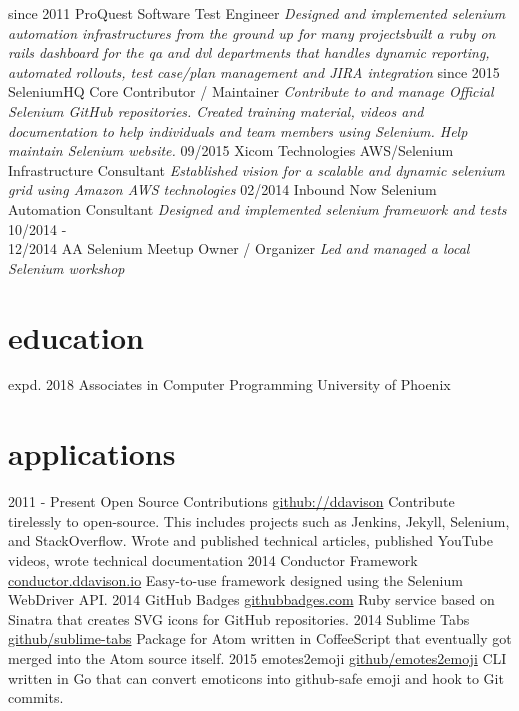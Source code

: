 \documentclass[]{ddavison-resume}
\begin{document}
\begin{entrylist}
  \entry
  	{since 2011}
  	{ProQuest}
  	{Software Test Engineer}
  	{\emph{Designed and implemented selenium automation infrastructures from the ground up for many projects\bullet built a ruby on rails dashboard for the qa and dvl departments that handles dynamic reporting, automated rollouts, test case/plan management and JIRA integration}} 
  \entry
  	{since 2015}
  	{SeleniumHQ}
  	{Core Contributor / Maintainer}
  	{\emph{Contribute to and manage Official Selenium GitHub repositories. Created training material, videos and documentation to help individuals and team members using Selenium.  Help maintain Selenium website.}}
  \entry
  	{09/2015}
  	{Xicom Technologies}
  	{AWS/Selenium Infrastructure Consultant}
  	{\emph{Established vision for a scalable and dynamic selenium grid using Amazon AWS technologies}}
  \entry
  	{02/2014}
  	{Inbound Now}
  	{Selenium Automation Consultant}
  	{\emph{Designed and implemented selenium framework and tests}}
  \entry
  	{10/2014 - \\
  	12/2014}
  	{AA Selenium Meetup}
  	{Owner / Organizer}
  	{\emph{Led and managed a local Selenium workshop}}
\end{entrylist}

\section{education}

\begin{entrylist}
  \entry
    {expd. 2018}
    {Associates {\normalfont in Computer Programming}}
    {University of Phoenix}
    {}
\end{entrylist}

\section{applications}

\begin{entrylist}
  \entry
    {2011 - Present}
    {Open Source Contributions}
    {\href{https://github.com/ddavison}{github://ddavison}}
    {Contribute tirelessly to open-source.  This includes projects such as Jenkins, Jekyll, Selenium, and StackOverflow. Wrote and published technical articles, published YouTube videos, wrote technical documentation}
  \entry
    {2014}
    {Conductor Framework}
    {\href{https://conductor.ddavison.io}{conductor.ddavison.io}}
    {Easy-to-use framework designed using the Selenium WebDriver API.}
  \entry
    {2014}
    {GitHub Badges}
    {\href{https://github.com/ddavison/github-badges}{githubbadges.com}}
    {Ruby service based on Sinatra that creates SVG icons for GitHub repositories.}
  \entry
    {2014}
    {Sublime Tabs}
    {\href{https://github.com/ddavison/sublime-tabs}{github/sublime-tabs}}
    {Package for Atom written in CoffeeScript that eventually got merged into the Atom source itself.}
  \entry
  	{2015}
  	{emotes2emoji}
  	{\href{https://github.com/ddavison/emotes2emoji}{github/emotes2emoji}}
  	{CLI written in Go that can convert emoticons  into github-safe emoji and hook to Git commits.}
\end{entrylist}
\end{document}

